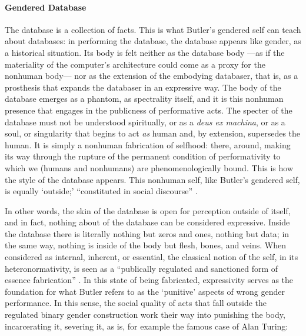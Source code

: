 \paragraph{Gendered Database}
The database is a collection of facts. This is what Butler's gendered self can teach about databases: in performing the database, the database appears like gender, as a historical situation. Its body is felt neither as the database body ---as if the materiality of the computer's architecture could come as a proxy for the nonhuman body--- nor as the extension of the embodying databaser, that is, as a prosthesis that expands the databaser in an expressive way. The body of the database emerges as a phantom, as spectrality itself, and it is this nonhuman presence that engages in the publicness of performative acts. The specter of the database must not be understood spiritually, or as a \textit{deus ex machina}, or as a soul, or singularity that begins to act \textit{as} human and, by extension, supersedes the human. It is simply a nonhuman fabrication of selfhood: there, around, making its way through the rupture of the permanent condition of performativity to which we (humans and nonhumans) are phenomenologically bound. This is how the style of the database appears. This nonhuman self, like Butler's gendered self, is equally `outside;' ``constituted in social discourse'' \parencite[528]{But88:Per}. 


In other words, the skin of the database is open for perception outside of itself, and in fact, nothing about of the database can be considered expressive. Inside the database there is literally nothing but zeros and ones, nothing but data; in the same way, nothing is inside of the body but flesh, bones, and veins. When considered as internal, inherent, or essential, the classical notion of the self, in its heteronormativity, is seen as a ``publically regulated and sanctioned form of essence fabrication'' \parencite[528]{But88:Per}. In this state of being fabricated, expressivity serves as the foundation for what Butler refers to as the `punitive' aspects of wrong gender performance. In this sense, the social quality of acts that fall outside the regulated binary gender construction work their way into punishing the body, incarcerating it, severing it, as is, for example the famous case of Alan Turing:

